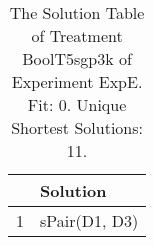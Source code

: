 \begin{table}[ht]
\centering
\begin{tabular}{rp{9cm}}
  \hline
 & Solution \\ 
  \hline
1 & sPair(D1, D3) \\ 
   \hline
\end{tabular}
\caption{The Solution Table of Treatment BoolT5sgp3k of Experiment ExpE. Fit: 0. Unique Shortest Solutions: 11.} 
\end{table}
